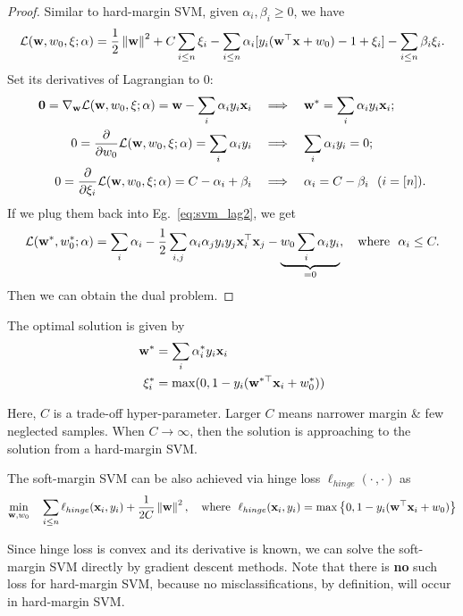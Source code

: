 \begin{proof}
	Similar to hard-margin SVM, given $\alpha_i, \beta_i \geq 0$, we have
	\begin{equation}
		\mathcal{L}(\mathbf{w}, w_0, \xi; \alpha) = \frac{1}{2} \left\lVert \mathbf{w} \right\rVert^2 + C \sum_{i \leq n} \xi_i  - \sum_{i \leq n} \alpha_i [y_i(\mathbf{w}^\top \mathbf{x} + w_0) - 1 + \xi_i] - \sum_{i \leq n} \beta_i \xi_i.\label{eq:svm_lag2}
	\end{equation}
	Set its derivatives of Lagrangian to $0$:
	\begin{align}
		\mathbf{0} = \nabla_{\mathbf{w}} \mathcal{L}(\mathbf{w}, w_0, \xi; \alpha) = \mathbf{w} - \sum_i \alpha_i y_i \mathbf{x}_i \quad & \Longrightarrow\quad \mathbf{w}^* = \sum_i \alpha_i y_i \mathbf{x}_i; \\
		{0} = \frac{\partial}{\partial w_0} \mathcal{L}(\mathbf{w}, w_0, \xi; \alpha) = \sum_i \alpha_i y_i \quad & \Longrightarrow\quad  \sum_i \alpha_i y_i = 0; \\
		{0} = \frac{\partial}{\partial \xi_i} \mathcal{L}(\mathbf{w}, w_0, \xi; \alpha) = C - \alpha_i + \beta_i \quad & \Longrightarrow\quad  \alpha_i = C - \beta_i \ \ (i = [n]).	
	\end{align}
	If we plug them back into Eg.~\ref{eq:svm_lag2}, we get
	\begin{equation}
		\mathcal{L}(\mathbf{w}^*, w_0^*; \alpha) = \sum_i \alpha_i - \frac{1}{2} \sum_{i, j} \alpha_i \alpha_j y_i y_j \mathbf{x}_i^\top \mathbf{x}_j - \underbrace{w_0 \sum_i \alpha_i y_i}_{=0}, \quad \text{where}\ \  \alpha_i \leq C.
	\end{equation}
	Then we can obtain the dual problem.
\end{proof}

The optimal solution is given by
\begin{align}
	\mathbf{w}^* & = \sum_i \alpha_i^* y_i \mathbf{x}_i \\
	\xi_i^* & = \max(0, 1 - y_i(\mathbf{w}^{* \top}\mathbf{x}_i + w_0^*))
\end{align}

\remark Here, $C$ is a trade-off hyper-parameter. Larger $C$ means narrower margin \& few neglected samples. When $C \rightarrow \infty$, then the solution is approaching to the solution from a hard-margin SVM.

\begin{property}
The soft-margin SVM can be also achieved via hinge loss $\ell_{hinge}(\cdot\, , \cdot)$ as
$$
\min_{\mathbf{w}, w_0}\quad \sum_{i \leq n} \ell_{hinge}(\mathbf{x}_i, y_i) + \frac{1}{2C} \left\lVert \mathbf{w} \right\rVert^2, \quad \text{where}\ \  \ell_{hinge}(\mathbf{x}_i, y_i) = \max\left\{0, 1 - y_i (\mathbf{w}^\top \mathbf{x}_i + w_0 ) \right\}
$$
\end{property}
\remark Since hinge loss is convex and its derivative is known, we can solve the soft-margin SVM directly by gradient descent methods. Note that there is \textbf{no} such loss for hard-margin SVM, because no misclassifications, by definition, will occur in hard-margin SVM.


